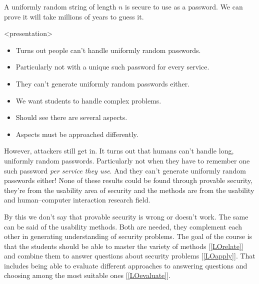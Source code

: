 \begin{example}\label{SecurePassword}
  A uniformly random string of length \(n\) is secure to use as a password.
  We can prove it will take millions of years to guess it.
\end{example}

\begin{frame}<presentation>
  \begin{example}[Usability]
    \begin{itemize}
      \item Turns out people can't handle uniformly random passwords.
      \item Particularly not with a unique such password for every service.
      \item They can't generate uniformly random passwords either.
    \end{itemize}
  \end{example}

  \pause

  \begin{remark}
    \begin{itemize}
      \item We want students to handle complex problems.
      \item Should see there are several aspects.
      \item Aspects must be approached differently.
    \end{itemize}
  \end{remark}
\end{frame}

However, attackers still get in.
It turns out that humans can't handle long, uniformly random passwords.
Particularly not when they have to remember one such password \emph{per service 
they use}.
And they can't generate uniformly random passwords either!
None of these results could be found through provable security, they're from 
the usability area of security and the methods are from the usability and 
human--computer interaction research field.

By this we don't say that provable security is wrong or doesn't work.
The same can be said of the usability methods.
Both are needed, they complement each other in generating understanding of 
security problems.
The goal of the course is that the students should be able to master the 
variety of methods [\ref{LOrelate}] and combine them to answer questions about 
security problems [\ref{LOapply}].
That includes being able to evaluate different approaches to answering 
questions and choosing among the most suitable ones [\ref{LOevaluate}].

